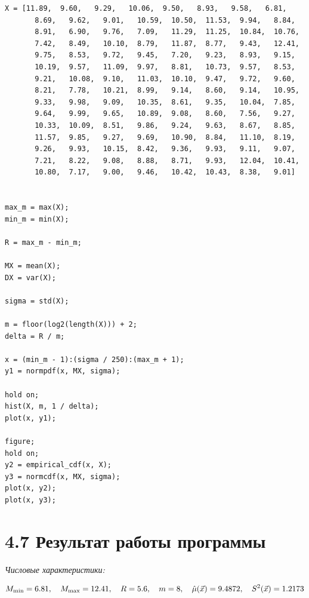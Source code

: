 \documentclass[12pt]{report}
\begin{document}
\begin{lstlisting}
X = [11.89,  9.60,   9.29,   10.06,  9.50,   8.93,   9.58,   6.81,   
	   8.69,   9.62,   9.01,   10.59,  10.50,  11.53,  9.94,   8.84,
	   8.91,   6.90,   9.76,   7.09,   11.29,  11.25,  10.84,  10.76,  
	   7.42,   8.49,   10.10,  8.79,   11.87,  8.77,   9.43,   12.41,  
	   9.75,   8.53,   9.72,   9.45,   7.20,   9.23,   8.93,   9.15,   
	   10.19,  9.57,   11.09,  9.97,   8.81,   10.73,  9.57,   8.53,   
	   9.21,   10.08,  9.10,   11.03,  10.10,  9.47,   9.72,   9.60,   
	   8.21,   7.78,   10.21,  8.99,   9.14,   8.60,   9.14,   10.95,
	   9.33,   9.98,   9.09,   10.35,  8.61,   9.35,   10.04,  7.85,
	   9.64,   9.99,   9.65,   10.89,  9.08,   8.60,   7.56,   9.27,   
	   10.33,  10.09,  8.51,   9.86,   9.24,   9.63,   8.67,   8.85,   
	   11.57,  9.85,   9.27,   9.69,   10.90,  8.84,   11.10,  8.19,   
	   9.26,   9.93,   10.15,  8.42,   9.36,   9.93,   9.11,   9.07,   
	   7.21,   8.22,   9.08,   8.88,   8.71,   9.93,   12.04,  10.41,  
	   10.80,  7.17,   9.00,   9.46,   10.42,  10.43,  8.38,   9.01]
	
	
max_m = max(X);
min_m = min(X);

R = max_m - min_m;

MX = mean(X);
DX = var(X);

sigma = std(X);

m = floor(log2(length(X))) + 2;
delta = R / m;                  

x = (min_m - 1):(sigma / 250):(max_m + 1);
y1 = normpdf(x, MX, sigma);

hold on;
hist(X, m, 1 / delta);
plot(x, y1);

figure;
hold on;
y2 = empirical_cdf(x, X);
y3 = normcdf(x, MX, sigma);
plot(x, y2);
plot(x, y3);
\end{lstlisting}

\section*{4.7 Результат работы программы}

\textit{Числовые характеристики:}

\begin{equation*}
	M_{\min} = 6.81, \quad M_{\max} = 12.41, \quad R = 5.6, \quad m = 8, \quad \hat\mu(\vec x) = 9.4872, \quad S^2(\vec x) = 1.2173 \\
\end{equation*}
\end{document}
